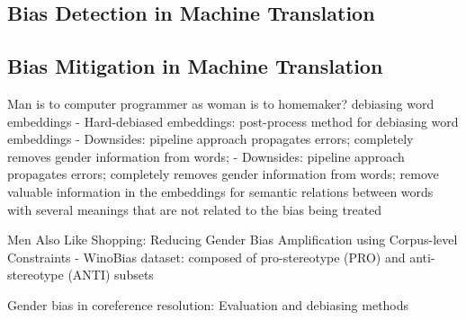 
\parencite{Savoldi_2021}



\subsection{Bias Detection in Machine Translation}
\label{sec:Background:Bias_Detection}



\subsection{Bias Mitigation in Machine Translation}
\label{sec:Background:Bias_Mitigation}




Man is to computer programmer as woman is to
homemaker? debiasing word embeddings \parencite{bolukbasi2016man}
- Hard-debiased embeddings: post-process method for debiasing word embeddings
- Downsides: pipeline approach propagates errors; completely removes gender information from words; 
- Downsides: pipeline approach propagates errors; completely removes gender information from words;  remove valuable information in the embeddings for semantic relations between words with several meanings that are not related to the bias being treated

Men Also Like Shopping: Reducing Gender Bias Amplification using Corpus-level Constraints \parencite{Zhao_2017}
- WinoBias dataset: composed of pro-stereotype (PRO) and anti-stereotype (ANTI) subsets

Gender bias in coreference resolution: Evaluation and debiasing
methods \parencite{Zhao_2018_coreference}

